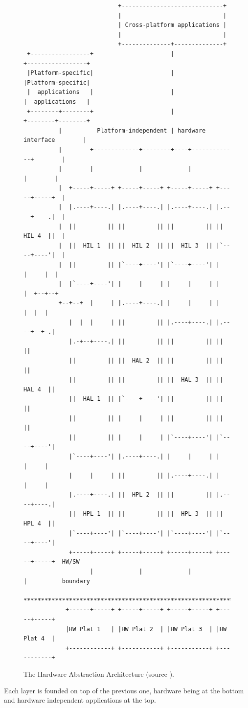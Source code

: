 \begin{figure}[h]
  \linespread{0}
  \begin{verbatim}
                           +-----------------------------+
                           |                             |
                           | Cross-platform applications |
                           |                             |
                           +--------------+--------------+
 +-----------------+                      |                  +-----------------+
 |Platform-specific|                      |                  |Platform-specific|
 |  applications   |                      |                  |  applications   |
 +--------+--------+                      |                  +--------+--------+
          |          Platform-independent | hardware interface        |
          |        +-------------+--------+----+-------------+        |
          |        |             |             |             |        |
          |  +-----+-----+ +-----+-----+ +-----+-----+ +-----+-----+  |
          |  |.----+----.| |.----+----.| |.----+----.| |.----+----.|  |
          |  ||         || ||         || ||         || ||  HIL 4  ||  |
          |  ||  HIL 1  || ||  HIL 2  || ||  HIL 3  || |`----+----'|  |
          |  ||         || |`----+----'| |`----+----'| |     |     |  |
          |  |`----+----'| |     |     | |     |     | |     |  +--+--+
          +--+--+  |     | |.----+----.| |     |     | |     |  |  |
             |  |  |     | ||         || |.----+----.| |.----+--+-.|
             |.-+--+----.| ||         || ||         || ||         ||
             ||         || ||  HAL 2  || ||         || ||         ||
             ||         || ||         || ||  HAL 3  || ||  HAL 4  ||
             ||  HAL 1  || |`----+----'| ||         || ||         ||
             ||         || |     |     | ||         || ||         ||
             ||         || |     |     | |`----+----'| |`----+----'|
             |`----+----'| |.----+----.| |     |     | |     |     |
             |     |     | ||         || |.----+----.| |     |     |
             |.----+----.| ||  HPL 2  || ||         || |.----+----.|
             ||  HPL 1  || ||         || ||  HPL 3  || ||  HPL 4  ||
             |`----+----'| |`----+----'| |`----+----'| |`----+----'|
             +-----+-----+ +-----+-----+ +-----+-----+ +-----+-----+  HW/SW
                   |             |             |             |          boundary
        ************************************************************************
            +------+-----+ +-----+-----+ +-----+-----+ +-----+-----+
            |HW Plat 1   | |HW Plat 2  | |HW Plat 3  | |HW Plat 4  |
            +------------+ +-----------+ +-----------+ +-----------+
  \end{verbatim}
  \centering
  \caption{The Hardware Abstraction Architecture (source \cite{TEP2}).}
  \label{fig:haa_diagram}
\end{figure}
Each layer is founded on top of the previous one, hardware being at the bottom and hardware independent applications at the top.

